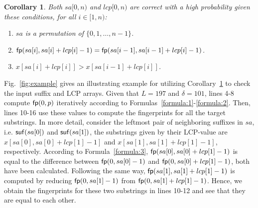 \documentclass[10pt,journal,compsoc]{IEEEtran}
\newtheorem{Corollary}{Corollary}
\begin{document}
\begin{Corollary} \label{corollary:1}
	Both $sa[0, n)$ and $lcp[0, n)$ are correct with a high probability given these conditions, for all $i \in [1, n)$:
	
	\begin{enumerate}[(1)]
		\item
		$sa$ is a permutation of $\{0, 1, \dots, n - 1\}$.
		
		\item
		${\sf fp}(sa[i], sa[i] + lcp[i] - 1) = {\sf fp}(sa[i - 1], sa[i - 1] + lcp[i] - 1)$.
		
		\item
		$x[sa[i] + lcp[i]] > x[sa[i - 1] + lcp[i]]$.
	\end{enumerate}
\end{Corollary}

Fig.~\ref{fig:example} gives an illustrating example for utilizing Corollary~\ref{corollary:1} to check the input suffix and LCP arrays. Given that $L = 197$ and $\delta = 101$, lines 4-8 compute ${\sf fp}(0, p)$ iteratively according to Formulas~\ref{formula:1}-\ref{formula:2}. Then, lines 10-16 use these values to compute the fingerprints for all the target substrings. In more detail, consider the leftmost pair of neighboring suffixes in $sa$, i.e. ${\sf suf}(sa[0])$ and ${\sf suf}(sa[1])$, the substrings given by their LCP-value are $x[sa[0], sa[0] + lcp[1] - 1]$ and $x[sa[1], sa[1] + lcp[1] - 1]$, respectively. According to Formula~\ref{formula:3}, ${\sf fp}(sa[0], sa[0] + lcp[1] - 1)$ is equal to the difference between ${\sf fp}(0, sa[0] - 1)$ and ${\sf fp}(0, sa[0] + lcp[1] - 1)$, both have been calculated. Following the same way, ${\sf fp}(sa[1], sa[1] + lcp[1] - 1)$ is computed by reducing ${\sf fp}(0, sa[1] - 1)$ from ${\sf fp}(0, sa[1] + lcp[1] - 1)$. Hence, we obtain the fingerprints for these two substrings in lines 10-12 and see that they are equal to each other. 
\end{document}
